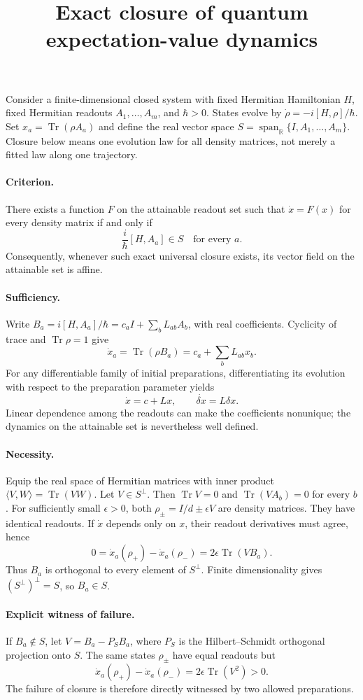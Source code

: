 \documentclass[11pt,a4paper]{article}
\newcommand{\Tr}{\operatorname{Tr}}
\begin{document}
\title{Exact closure of quantum expectation-value dynamics}
\author{}
\date{}
\maketitle
Consider a finite-dimensional closed system with fixed Hermitian Hamiltonian $H$, fixed Hermitian readouts $A_1,\ldots,A_m$, and $\hbar>0$. States evolve by $\dot\rho=-i[H,\rho]/\hbar$. Set $x_a=\Tr(\rho A_a)$ and define the real vector space $S=\operatorname{span}_{\mathbb R}\{I,A_1,\ldots,A_m\}$. Closure below means one evolution law for all density matrices, not merely a fitted law along one trajectory.
\paragraph{Criterion.}
There exists a function $F$ on the attainable readout set such that $\dot x=F(x)$ for every density matrix if and only if
\[\frac{i}{\hbar}[H,A_a]\in S\quad\text{for every }a.\]
Consequently, whenever such exact universal closure exists, its vector field on the attainable set is affine.
\paragraph{Sufficiency.}
Write $B_a=i[H,A_a]/\hbar=c_aI+\sum_bL_{ab}A_b$, with real coefficients. Cyclicity of trace and $\Tr\rho=1$ give
\[\dot x_a=\Tr(\rho B_a)=c_a+\sum_bL_{ab}x_b.\]
For any differentiable family of initial preparations, differentiating its evolution with respect to the preparation parameter yields
\[\dot x=c+Lx,\qquad\dot{\delta x}=L\delta x.\]
Linear dependence among the readouts can make the coefficients nonunique; the dynamics on the attainable set is nevertheless well defined.
\paragraph{Necessity.}
Equip the real space of Hermitian matrices with inner product $\langle V,W\rangle=\Tr(VW)$. Let $V\in S^\perp$. Then $\Tr V=0$ and $\Tr(VA_b)=0$ for every $b$. For sufficiently small $\epsilon>0$, both $\rho_\pm=I/d\pm\epsilon V$ are density matrices. They have identical readouts. If $\dot x$ depends only on $x$, their readout derivatives must agree, hence
\[0=\dot x_a(\rho_+)-\dot x_a(\rho_-)=2\epsilon\Tr(VB_a).\]
Thus $B_a$ is orthogonal to every element of $S^\perp$. Finite dimensionality gives $(S^\perp)^\perp=S$, so $B_a\in S$.
\paragraph{Explicit witness of failure.}
If $B_a\notin S$, let $V=B_a-P_SB_a$, where $P_S$ is the Hilbert--Schmidt orthogonal projection onto $S$. The same states $\rho_\pm$ have equal readouts but
\[\dot x_a(\rho_+)-\dot x_a(\rho_-)=2\epsilon\Tr(V^2)>0.\]
The failure of closure is therefore directly witnessed by two allowed preparations.
\end{document}
